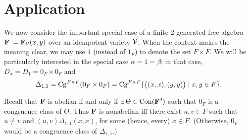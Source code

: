 \section{Application}
We now consider the important special case of a finite 2-generated
free algebra $\mathbf{F} := \mathbf{F}_{\mathcal{V}}(x,y)$ over an idempotent variety $\mathcal{V}$. 
When the context makes the meaning clear, we may use $1$ (instead of
$1_F$) to denote the set $F \times F$. 
We will be particularly interested in the special case $\alpha = 1 = \beta$;
in that case, $D_\alpha = D_1 = 0_F \times 0_F$ and
\begin{equation}
\label{eq:11}  
\Delta_{1, 1} = \operatorname{Cg}^{F\times F}(0_F \times 0_F)
 = \operatorname{Cg}^{F\times F}\{\bigl((x,x), (y,y)\bigr) \mid x, y \in F\}.
\end{equation}

Recall that $\mathbf{F}$ is abelian if and only if
 $\exists\, \Theta \in \operatorname{Con} (\mathbf{F}^2)$ such that $0_F$ %
 is a congruence class of $\Theta$. 
 Thus $\mathbf{F}$ is nonabelian iff there exist
 $u, v\in F$ such that
 $u \neq v$ and $(u,v)\mathrel{\Delta_{1,1}}(x,x)$,
 for some (hence, every) $x\in F$. 
 (Otherwise, $0_F$ would be a congruence class of $\Delta_{1,1}$.)






